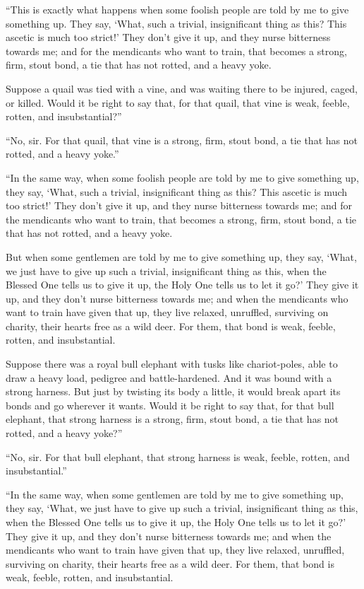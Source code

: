 \documentclass[12pt,openany]{book}%
\begin{document}
“This is exactly what happens when some foolish people are told by me to give something up. They say, ‘What, such a trivial, insignificant thing as this? This ascetic is much too strict!’ They don’t give it up, and they nurse bitterness towards me; and for the mendicants who want to train, that becomes a strong, firm, stout bond, a tie that has not rotted, and a heavy yoke. 

Suppose a quail was tied with a vine, and was waiting there to be injured, caged, or killed. Would it be right to say that, for that quail, that vine is weak, feeble, rotten, and insubstantial?” 

“No, sir. For that quail, that vine is a strong, firm, stout bond, a tie that has not rotted, and a heavy yoke.” 

“In the same way, when some foolish people are told by me to give something up, they say, ‘What, such a trivial, insignificant thing as this? This ascetic is much too strict!’ They don’t give it up, and they nurse bitterness towards me; and for the mendicants who want to train, that becomes a strong, firm, stout bond, a tie that has not rotted, and a heavy yoke. 

But when some gentlemen are told by me to give something up, they say, ‘What, we just have to give up such a trivial, insignificant thing as this, when the Blessed One tells us to give it up, the Holy One tells us to let it go?’ They give it up, and they don’t nurse bitterness towards me; and when the mendicants who want to train have given that up, they live relaxed, unruffled, surviving on charity, their hearts free as a wild deer. For them, that bond is weak, feeble, rotten, and insubstantial. 

Suppose there was a royal bull elephant with tusks like chariot-poles, able to draw a heavy load, pedigree and battle-hardened. And it was bound with a strong harness. But just by twisting its body a little, it would break apart its bonds and go wherever it wants. Would it be right to say that, for that bull elephant, that strong harness is a strong, firm, stout bond, a tie that has not rotted, and a heavy yoke?” 

“No, sir. For that bull elephant, that strong harness is weak, feeble, rotten, and insubstantial.” 

“In the same way, when some gentlemen are told by me to give something up, they say, ‘What, we just have to give up such a trivial, insignificant thing as this, when the Blessed One tells us to give it up, the Holy One tells us to let it go?’ They give it up, and they don’t nurse bitterness towards me; and when the mendicants who want to train have given that up, they live relaxed, unruffled, surviving on charity, their hearts free as a wild deer. For them, that bond is weak, feeble, rotten, and insubstantial. 
\end{document}
